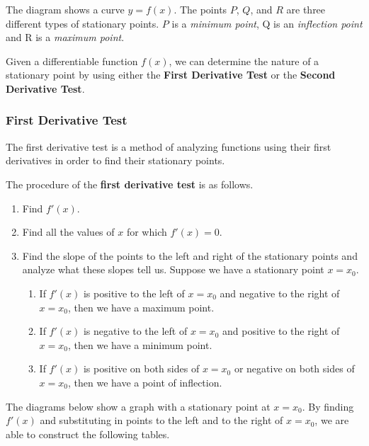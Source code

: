 \documentclass[11pt,a4paper]{book}
\begin{document}
The diagram shows a curve $y=f(x)$. The points $P$, $Q$, and $R$
are three different types of stationary points. $P$ is a \textit{minimum
point}, Q is an \textit{inflection point} and R is a \textit{maximum
point}.

Given a differentiable function $f\left(x\right)$, we can determine
the nature of a stationary point by using either the \textbf{First
Derivative Test} or the\textbf{ Second Derivative Test}.

\subsubsection{First Derivative Test}

The first derivative test is a method of analyzing functions using
their first derivatives in order to find their stationary points.

\begin{tcolorbox}[colback=blue!5, colframe=black, boxrule=.4pt, sharpish corners]

The procedure of the\textbf{ first derivative test} is as follows.
\begin{enumerate}
\item Find $f'\left(x\right)$.
\item Find all the values of $x$ for which $f'\left(x\right)=0$.
\item Find the slope of the points to the left and right of the stationary
points and analyze what these slopes tell us. Suppose we have a stationary
point $x=x_{0}$.
\begin{enumerate}
\item If $f'\left(x\right)$ is positive to the left of $x=x_{0}$ and negative
to the right of $x=x_{0}$, then we have a maximum point.
\item If $f'\left(x\right)$ is negative to the left of $x=x_{0}$ and positive
to the right of $x=x_{0}$, then we have a minimum point.
\item If $f'\left(x\right)$ is positive on both sides of $x=x_{0}$ or
negative on both sides of $x=x_{0}$, then we have a point of inflection.
\end{enumerate}
\end{enumerate}
\end{tcolorbox}


The diagrams below show a graph with a stationary point at $x=x_{0}$.
By finding $f'\left(x\right)$ and substituting in points to the left
and to the right of $x=x_{0}$, we are able to construct the following
tables.
\end{document}
